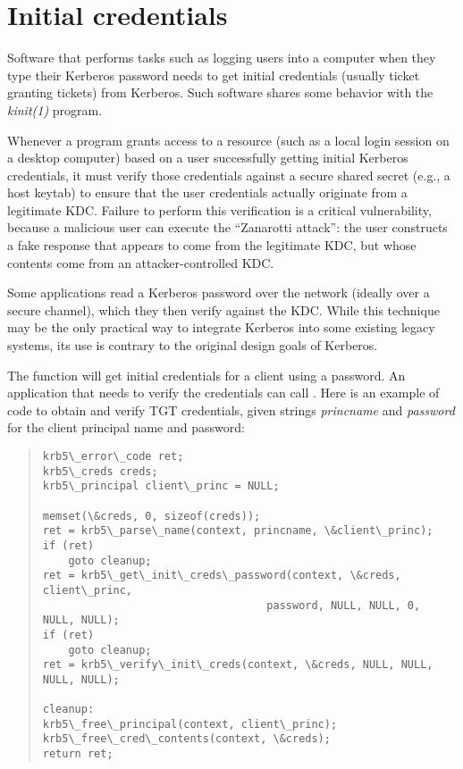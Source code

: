 \documentclass[letterpaper,10pt,english]{sphinxmanual}
\begin{document}
\chapter{Initial credentials}
\label{appdev/init_creds:initial-credentials}\label{appdev/init_creds::doc}
Software that performs tasks such as logging users into a computer
when they type their Kerberos password needs to get initial
credentials (usually ticket granting tickets) from Kerberos.  Such
software shares some behavior with the \emph{kinit(1)} program.

Whenever a program grants access to a resource (such as a local login
session on a desktop computer) based on a user successfully getting
initial Kerberos credentials, it must verify those credentials against
a secure shared secret (e.g., a host keytab) to ensure that the user
credentials actually originate from a legitimate KDC.  Failure to
perform this verification is a critical vulnerability, because a
malicious user can execute the ``Zanarotti attack'': the user constructs
a fake response that appears to come from the legitimate KDC, but
whose contents come from an attacker-controlled KDC.

Some applications read a Kerberos password over the network (ideally
over a secure channel), which they then verify against the KDC.  While
this technique may be the only practical way to integrate Kerberos
into some existing legacy systems, its use is contrary to the original
design goals of Kerberos.

The function {\hyperref[appdev/refs/api/krb5_get_init_creds_password:krb5_get_init_creds_password]{}} will get initial
credentials for a client using a password.  An application that needs
to verify the credentials can call {\hyperref[appdev/refs/api/krb5_verify_init_creds:krb5_verify_init_creds]{}}.
Here is an example of code to obtain and verify TGT credentials, given
strings \emph{princname} and \emph{password} for the client principal name and
password:
\begin{quote}

\begin{Verbatim}[commandchars=\\\{\}]
krb5\_error\_code ret;
krb5\_creds creds;
krb5\_principal client\_princ = NULL;

memset(\&creds, 0, sizeof(creds));
ret = krb5\_parse\_name(context, princname, \&client\_princ);
if (ret)
    goto cleanup;
ret = krb5\_get\_init\_creds\_password(context, \&creds, client\_princ,
                                   password, NULL, NULL, 0, NULL, NULL);
if (ret)
    goto cleanup;
ret = krb5\_verify\_init\_creds(context, \&creds, NULL, NULL, NULL, NULL);

cleanup:
krb5\_free\_principal(context, client\_princ);
krb5\_free\_cred\_contents(context, \&creds);
return ret;
\end{Verbatim}
\end{quote}
\end{document}
